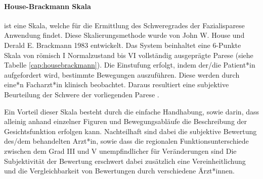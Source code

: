 \paragraph{House-Brackmann Skala} ist eine Skala, welche für die Ermittlung des Schweregrades der Fazialisparese Anwendung findet. Diese Skalierungsmethode wurde von John W. House und Derald E. Brackmann 1983 entwickelt. Das System beinhaltet eine 6-Punkte Skala von römisch I Normalzustand bis VI vollständig ausgeprägte Parese (siehe Tabelle \ref{cap:housebrackmann}). Die Einstufung erfolgt, indem der/die Patient*in aufgefordert wird, bestimmte Bewegungen auszuführen. Diese werden durch eine*n Facharzt*in klinisch beobachtet. Daraus resultiert eine subjektive Beurteilung der Schwere der vorliegenden Parese \cite{housebrackmann}.

Ein Vorteil dieser Skala besteht durch die einfache Handhabung, sowie darin, dass alleinig anhand einzelner Figuren und Bewegungsabläufe die Beschreibung der Gesichtsfunktion erfolgen kann. Nachteilhaft sind dabei die subjektive Bewertung des/dem behandelten Arzt*in, sowie dass die regionalen Funktionsunterschiede zwischen dem Grad III und V unempfindlicher für Veränderungen sind Die Subjektivität der Bewertung erschwert dabei zusätzlich eine Vereinheitlichung und die Vergleichbarkeit von Bewertungen durch verschiedene Ärzt*innen.

